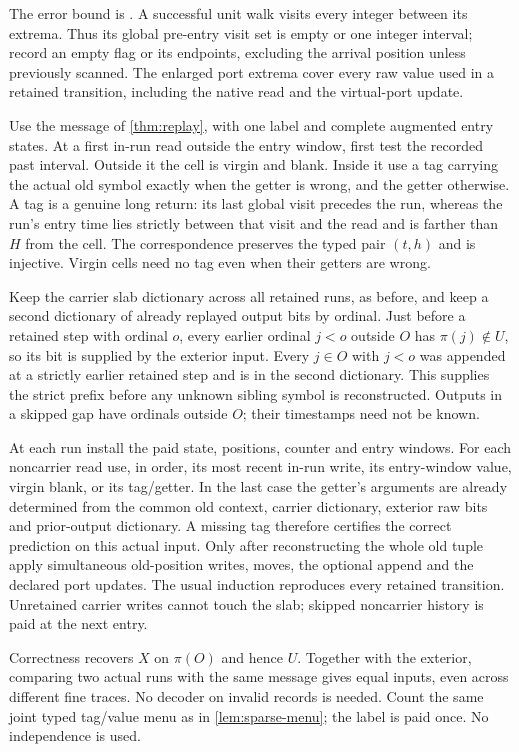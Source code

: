\begin{outline}
The error bound is .
A successful unit walk visits every integer between its extrema. Thus its
global pre-entry visit set is empty or one integer interval; record an empty
flag or its endpoints, excluding the arrival position unless previously
scanned. The enlarged port extrema cover every raw value used in a retained
transition, including the native read and the virtual-port update.

Use the message of \cref{thm:replay}, with one label and complete augmented
entry states. At a first in-run read outside the entry window, first test
the recorded past interval. Outside it the cell is virgin and blank.
Inside it use a tag carrying the actual old symbol exactly when the getter
is wrong, and the getter otherwise. A tag is a genuine long return:
its last global visit precedes the run, whereas the run's entry time lies
strictly between that visit and the read and is farther than $H$ from
the cell. The correspondence preserves the typed pair $(t,h)$ and is
injective. Virgin cells need no tag even when their getters are wrong.

Keep the carrier slab dictionary across all retained runs, as before,
and keep a second dictionary of already replayed output bits by ordinal.
Just before a retained step with ordinal $o$, every earlier ordinal $j<o$
outside $O$ has $\pi(j)\notin U$, so its bit is supplied by the exterior
input. Every $j\in O$ with $j<o$ was appended at a strictly earlier
retained step and is in the second dictionary. This supplies the strict
prefix before any unknown sibling symbol is reconstructed. Outputs in a
skipped gap have ordinals outside $O$; their timestamps need not be known.

At each run install the paid state, positions, counter and entry windows.
For each noncarrier read use, in order, its most recent in-run write, its
entry-window value, virgin blank, or its tag/getter. In the last case the
getter's arguments are already determined from the common old context,
carrier dictionary, exterior raw bits and prior-output dictionary. A missing
tag therefore certifies the correct prediction on this actual input.
Only after reconstructing the whole old tuple apply simultaneous old-position
writes, moves, the optional append and the declared port updates. The usual
induction reproduces every retained transition. Unretained carrier writes
cannot touch the slab; skipped noncarrier history is paid at the next entry.

Correctness recovers $X$ on $\pi(O)$ and hence $U$. Together with the
exterior, comparing two actual runs with the same message gives equal inputs,
even across different fine traces. No decoder on invalid records is needed.
Count the same joint typed tag/value menu as in
\cref{lem:sparse-menu}; the label is paid once. No independence is used.
\end{outline}

